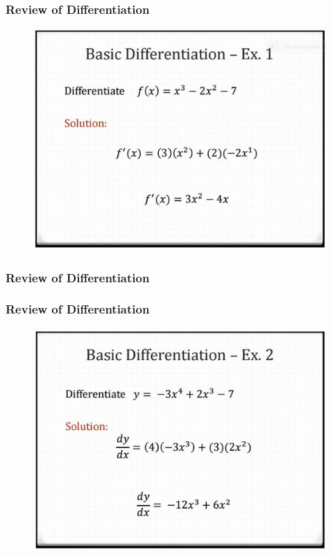 \documentclass{beamer}
\begin{document}
\begin{frame}
	
\frametitle{Review of Differentiation}
\begin{figure}
\centering
\includegraphics[width=0.95\linewidth]{diff1a}

\end{figure}
\end{frame}
\begin{frame}
	
	\frametitle{Review of Differentiation}
	
\end{frame}
\begin{frame}
	
	\frametitle{Review of Differentiation}
	\begin{figure}
		\centering
		\includegraphics[width=0.95\linewidth]{diff1b}
		
	\end{figure}
\end{frame}
\end{document}
